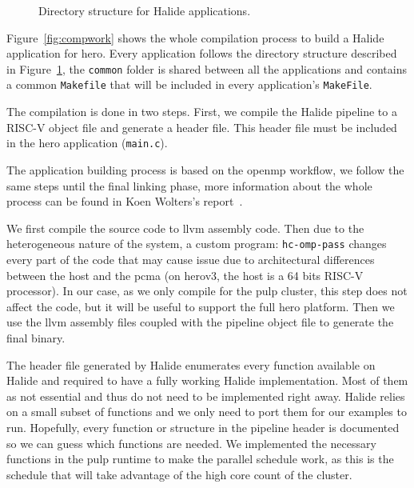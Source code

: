 \begin{figure}[h]
	\caption{Directory structure for Halide applications.}
	\label{Fig:DirectoryStructure}
\end{figure}


	Figure~\ref{fig:compwork} shows the whole compilation process to build a Halide application for \gls{hero}.
	Every application follows the directory structure described in Figure~\ref{Fig:DirectoryStructure}, the \texttt{common} folder is shared between all the applications and contains a common \texttt{Makefile} that will be included in every application's \texttt{MakeFile}.

	The compilation is done in two steps. First, we compile the Halide pipeline to a RISC-V object file and generate a header file.
	This header file must be included in the hero application (\texttt{main.c}).

	The application building process is based on the \gls{openmp} workflow, we follow the same steps until the final linking phase, more information about the whole process can be found in Koen Wolters's report~\cite{Report:SoftwareStack}.

	We first compile the  source code to \gls{llvm} assembly code. Then due to the heterogeneous nature of the system, a custom program: \texttt{hc-omp-pass} changes every part of the code that may cause issue due to architectural differences between the host and the \gls{pcma} (on \gls{hero}v3, the host is a 64 bits RISC-V processor).
	In our case, as we only compile for the \gls{pulp} cluster, this step does not affect the code, but it will be useful to support the full \gls{hero} platform. 
	Then we use the \gls{llvm} assembly files coupled with the pipeline object file to generate the final binary.


	The header file generated by Halide enumerates every function available on Halide and required to have a fully working Halide implementation. Most of them as not essential and thus do not need to be implemented right away.
	Halide relies on a small subset of functions and we only need to port them for our examples to run. Hopefully, every function or structure in the pipeline header is documented so we can guess which functions are needed.
	We implemented the necessary functions in the \gls{pulp} runtime to make the parallel schedule work, as this is the schedule that will take advantage of the high core count of the cluster.
 
